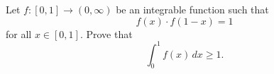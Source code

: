 Let \(f \colon [0,1] \to (0,\infty)\) be an integrable function such that
\[
f(x)\cdot f(1-x)=1
\]
for all \(x\in[0,1]\). Prove that
\[
\int_0^1 f(x)\,dx \ge 1.
\]
